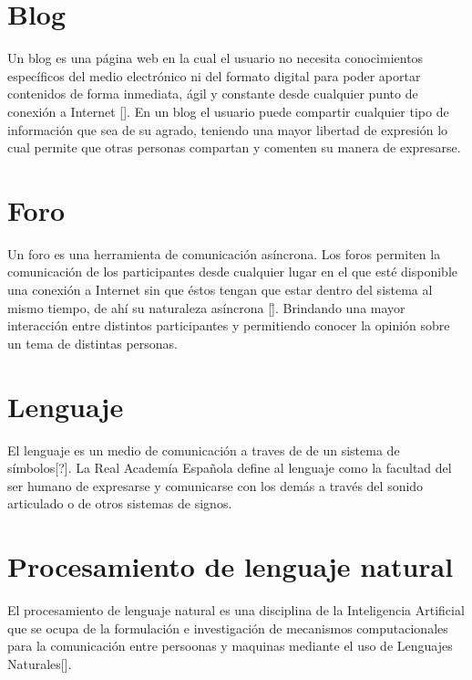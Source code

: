 \section{Blog}

Un blog es una página web en la cual el usuario no necesita conocimientos específicos del medio electrónico ni del formato digital para poder aportar contenidos de forma inmediata, ágil y constante desde cualquier punto de conexión a Internet [\:]. En un blog el usuario puede compartir cualquier tipo de información que sea de su agrado, teniendo una mayor libertad de expresión lo cual permite que otras personas compartan y comenten su manera de expresarse.

\section{Foro}

Un foro es una herramienta de comunicación asíncrona. Los  foros permiten la comunicación de los participantes desde cualquier lugar en el que  esté  disponible  una  conexión  a Internet  sin  que  éstos  tengan  que  estar dentro del sistema al mismo tiempo, de ahí su naturaleza asíncrona [\=]. Brindando una mayor interacción entre distintos participantes y permitiendo conocer la opinión sobre un tema de distintas personas.


\section{Lenguaje}

El lenguaje es un medio de comunicación a traves de de un sistema de símbolos[?].
La Real Academía Española define al lenguaje como la facultad del ser humano de expresarse y comunicarse con los demás a través del sonido articulado o de otros sistemas de signos.

\section{Procesamiento de lenguaje natural}

El procesamiento de lenguaje natural es una disciplina de la Inteligencia Artificial que se ocupa de la formulación e investigación de mecanismos computacionales para la comunicación entre persoonas y maquinas mediante el uso de Lenguajes Naturales[].

